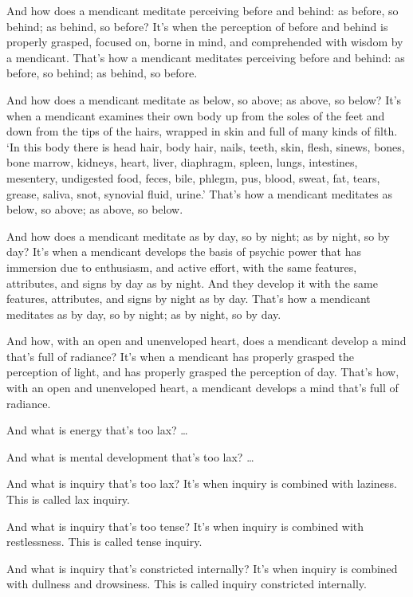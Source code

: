 \documentclass[12pt,openany]{book}%
\begin{document}
And how does a mendicant meditate perceiving before and behind: as before, so behind; as behind, so before? It’s when the perception of before and behind is properly grasped, focused on, borne in mind, and comprehended with wisdom by a mendicant. That’s how a mendicant meditates perceiving before and behind: as before, so behind; as behind, so before. 

And how does a mendicant meditate as below, so above; as above, so below? It’s when a mendicant examines their own body up from the soles of the feet and down from the tips of the hairs, wrapped in skin and full of many kinds of filth. ‘In this body there is head hair, body hair, nails, teeth, skin, flesh, sinews, bones, bone marrow, kidneys, heart, liver, diaphragm, spleen, lungs, intestines, mesentery, undigested food, feces, bile, phlegm, pus, blood, sweat, fat, tears, grease, saliva, snot, synovial fluid, urine.’ That’s how a mendicant meditates as below, so above; as above, so below. 

And how does a mendicant meditate as by day, so by night; as by night, so by day? It’s when a mendicant develops the basis of psychic power that has immersion due to enthusiasm, and active effort, with the same features, attributes, and signs by day as by night. And they develop it with the same features, attributes, and signs by night as by day. That’s how a mendicant meditates as by day, so by night; as by night, so by day. 

And how, with an open and unenveloped heart, does a mendicant develop a mind that’s full of radiance? It’s when a mendicant has properly grasped the perception of light, and has properly grasped the perception of day. That’s how, with an open and unenveloped heart, a mendicant develops a mind that’s full of radiance. 

And what is energy that’s too lax? … 

And what is mental development that’s too lax? … 

And what is inquiry that’s too lax? It’s when inquiry is combined with laziness. This is called lax inquiry. 

And what is inquiry that’s too tense? It’s when inquiry is combined with restlessness. This is called tense inquiry. 

And what is inquiry that’s constricted internally? It’s when inquiry is combined with dullness and drowsiness. This is called inquiry constricted internally. 
\end{document}
